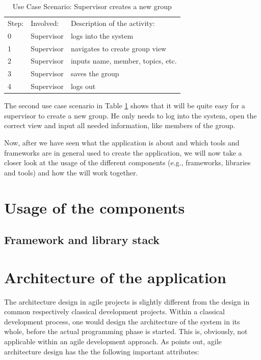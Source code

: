  \begin{table}[h]
\scriptsize
 \caption{Use Case Scenario: Supervisor creates a new group}
 \begin{tabular}{lll}
	\toprule
  Step: & Involved: & Description of the activity: \\ 
\cmidrule(rl){1-1}\cmidrule(rl){2-2}\cmidrule(rl){3-3}
  	0 	& Supervisor & logs into the system \\
	1	& Supervisor & navigates to create group view \\
	2	& Supervisor & inputs name, member, topics, etc. \\
	3	& Supervisor & saves the group \\	
	4	& Supervisor & logs out \\
	\bottomrule
 \end{tabular}
 \label{tab:ucGroupCreation}
 \end{table} 

The second use case scenario in Table \ref{tab:ucGroupCreation} shows that it will be quite easy for a supervisor to create a new group. He only needs to log into the system, open the correct view and input all needed information, like members of the group. 



Now, after we have seen what the application is about and which tools and frameworks are in general used to create the application, we will now take a closer look at the usage of the different components (e.g., frameworks, libraries and tools) and how the will work together.

\section{Usage of the components}


\subsection{Framework and library stack}


\section{Architecture of the application}
The architecture design in agile projects is slightly different from the design in common respectively classical development projects. Within a classical development process, one would design the architecture of the system in its whole, before the actual programming phase is started. This is, obviously, not applicable within an agile development approach. As \cite{Mast2013} points out, agile architecture design has the the following important attributes:

